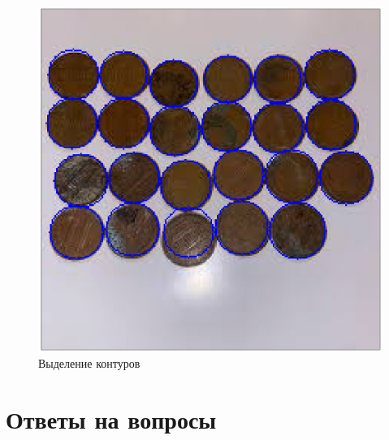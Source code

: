 \begin{figure}[H]
    \includegraphics[width=\textwidth]{../outputs/3_result.png}
    \caption{Выделение контуров}
\end{figure}


\section{Ответы на вопросы}

\setcounter{question}{0}

\newcommand{\question}[1]{\item[Q\refstepcounter{question}\thequestion.] #1}
\newcommand{\answer}[1]{\item[A\thequestion.] #1}

